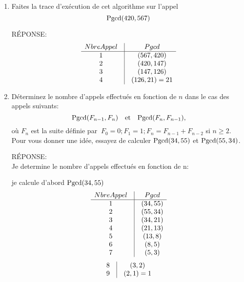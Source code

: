 \begin{enumerate}[\bf 1)]
\item{}  Faites la trace d'ex\'ecution  de cet algorithme sur l'appel
  $${\rm Pgcd}(420,567)$$

\begin{framed}

RÉPONSE:\\
\setcounter{MaxMatrixCols}{20}
\[
\begin{matrix}
 Nbre Appel&\vline&Pgcd \\
\hline
1&\vline&(567,420)  \\
2&\vline&(420,147)  \\
3&\vline&(147,126)  \\
4&\vline&(126,21)=21  \\
\end{matrix}
\]

\end{framed}

\item{} D\'eterminez le nombre d'appels effectu\'es en fonction de $n$ dans le cas des appels suivants:
$${\rm Pgcd}(F_{n - 1},F_n) \quad \mbox{et} \quad {\rm Pgcd}(F_n, F_{n-1}),$$
o\`u $F_n$ est la suite d\'efinie par
$\
F_0=0 ; F_1=1;
F_n=F_{n- 1}+F_{n-2}$ si $n\geq 2$.
Pour vous donner une id\'ee, essayez de calculer ${\rm Pgcd}(34,55)$ et ${\rm Pgcd}(55,34)$.



\begin{framed}

RÉPONSE:\\
Je determine le nombre d'appels effectués en fonction de n:

je calcule d'abord ${\rm Pgcd}(34,55)$
\setcounter{MaxMatrixCols}{20}
\[
\begin{matrix}
 Nbre Appel&\vline&Pgcd \\
\hline
1&\vline&(34,55)  \\
2&\vline&(55,34)  \\
3&\vline&(34,21)  \\
4&\vline&(21,13)  \\
5&\vline&(13,8)\\
6&\vline&(8,5)\\
7&\vline&(5,3)\\
\end{matrix}
\]
\[
\begin{matrix}
8&\vline&(3,2)\\
9&\vline&(2,1)=1\\
\end{matrix}
\]


\end{framed}
\end{enumerate}
